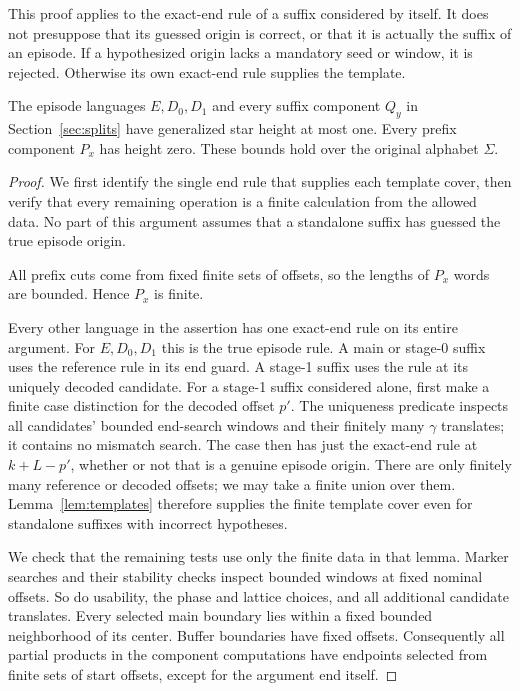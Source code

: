 This proof applies to the exact-end rule of a suffix considered by itself.
It does not presuppose that its guessed origin is correct, or that it is
actually the suffix of an episode.  If a hypothesized origin lacks a
mandatory seed or window, it is rejected.  Otherwise its own exact-end
rule supplies the template.

\begin{proposition}
\label{prop:components}
The episode languages $E,D_0,D_1$ and every suffix component $Q_y$ in
Section~\ref{sec:splits} have generalized star height at most one.
Every prefix component $P_x$ has height zero.  These bounds hold over
the original alphabet $\Sigma$.
\end{proposition}

\begin{proof}
We first identify the single end rule that supplies each template cover,
then verify that every remaining operation is a finite calculation from
the allowed data. No part of this argument assumes that a standalone
suffix has guessed the true episode origin.

All prefix cuts come from fixed finite sets of offsets, so the lengths
of $P_x$ words are bounded.  Hence $P_x$ is finite.

Every other language in the assertion has one exact-end rule on its
entire argument.  For $E,D_0,D_1$ this is the true episode rule.  A main
or stage-0 suffix uses the reference rule in its end guard.  A stage-1
suffix uses the rule at its uniquely decoded candidate. For a stage-1
suffix considered alone, first make a finite case distinction for the
decoded offset $p'$. The uniqueness predicate inspects all candidates'
bounded end-search windows and their finitely many $\gamma$ translates;
it contains no mismatch search. The case then has just the exact-end
rule at $k+L-p'$, whether or not that is a genuine episode origin.
There are only
finitely many reference or decoded offsets; we may take a finite union
over them.  Lemma~\ref{lem:templates} therefore supplies the finite
template cover even for standalone suffixes with incorrect hypotheses.

We check that the remaining tests use only the finite data in that lemma.
Marker searches and their stability checks inspect bounded windows at
fixed nominal offsets.  So do usability, the phase and lattice choices,
and all additional candidate translates.  Every selected main boundary
lies within a fixed bounded neighborhood of its center.  Buffer
boundaries have fixed offsets.  Consequently all partial products in
the component computations have endpoints selected from finite sets of
start offsets, except for the argument end itself.


\end{proof}

